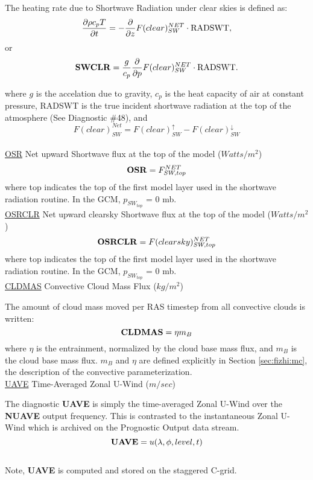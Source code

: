 \noindent
The heating rate due to Shortwave Radiation under clear skies is defined as:
\[
\frac{\partial \rho c_p T}{\partial t} = - \frac{\partial }{\partial z} F(clear)_{SW}^{NET} \cdot {\rm RADSWT},
\]
or
\[
{\bf SWCLR} = \frac{g}{c_p } \frac{\partial }{\partial p} F(clear)_{SW}^{NET}\cdot {\rm RADSWT} .
\]

\noindent
where $g$ is the accelation due to gravity,
$c_p$ is the heat capacity of air at constant pressure, RADSWT is the true incident
shortwave radiation at the top of the atmosphere (See Diagnostic \#48), and
\[
F(clear)_{SW}^{Net} = F(clear)_{SW}^\uparrow - F(clear)_{SW}^\downarrow
\]
\\

\noindent
{ \underline {OSR} Net upward Shortwave flux at the top of the model ($Watts/m^2$) }
\[
{\bf OSR}  =  F_{SW,top}^{NET}
\]                                                                                       
\noindent
where top indicates the top of the first model layer used in the shortwave radiation
routine.
In the GCM, $p_{SW_{top}}$ = 0 mb.
\\

\noindent
{ \underline {OSRCLR} Net upward clearsky Shortwave flux at the top of the model ($Watts/m^2$) }
\[
{\bf OSRCLR}  =  F(clearsky)_{SW,top}^{NET}
\]
\noindent
where top indicates the top of the first model layer used in the shortwave radiation
routine.
In the GCM, $p_{SW_{top}}$ = 0 mb.
\\


\noindent
{ \underline {CLDMAS} Convective Cloud Mass Flux ($kg/m^2$) } 

\noindent
The amount of cloud mass moved per RAS timestep from all convective clouds is written:
\[
{\bf CLDMAS} = \eta m_B
\]
where $\eta$ is the entrainment, normalized by the cloud base mass flux, and $m_B$ is
the cloud base mass flux. $m_B$ and $\eta$ are defined explicitly in Section \ref{sec:fizhi:mc}, the 
description of the convective parameterization.
\\



\noindent
{ \underline {UAVE} Time-Averaged Zonal U-Wind ($m/sec$) }

\noindent
The diagnostic {\bf UAVE} is simply the time-averaged Zonal U-Wind over
the {\bf NUAVE} output frequency.  This is contrasted to the instantaneous
Zonal U-Wind which is archived on the Prognostic Output data stream.
\[
{\bf UAVE} = u(\lambda, \phi, level , t)
\]
\\
Note, {\bf UAVE} is computed and stored on the staggered C-grid.
\\

